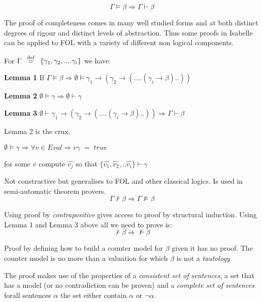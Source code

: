 \[ \Gamma \vDash \beta  \Rightarrow \Gamma \vdash \beta \]


The proof of completeness comes in many well studied  forms and at both distinct degrees of rigour and distinct levels of abstraction.  Thus some proofs in Isabelle can be applied to FOL with a variety of different non logical components. 

For $\Gamma  \hspace*{0.5em} \stackrel{\mathrm{def}}{=} \hspace*{0.5em} \{\gamma_1,\gamma_2,.... \gamma_i\}$
we have:

{\bf Lemma 1}
If $\Gamma \vDash \beta \Rightarrow \emptyset \vDash \gamma_1 \rightarrow (\gamma_2 \rightarrow (....(\gamma_i\rightarrow \beta)..))$

{\bf Lemma 2}
$ \emptyset\vDash \gamma  \Rightarrow \emptyset\vdash \gamma $

{\bf Lemma 3} $\emptyset \vdash \gamma_1 \rightarrow (\gamma_2 \rightarrow (....(\gamma_i\rightarrow \beta)..))\Rightarrow \Gamma \vdash \beta$


Lemma 2 is the crux. 

$ \emptyset\vDash \gamma  \Rightarrow \forall v\in Eval \Rightarrow v\gamma\; = \;true$

for some $v$ compute $\hat{v_j}$ so that $\{\hat{v_1},\hat{v_2},.. \hat{v_i}\} \vdash \gamma$



Not constructive but generalises to FOL and other classical logics. Is used in semi-automatic theorem provers. 
 \[ \Gamma \not\vdash \beta  \Rightarrow \Gamma \not\vDash \beta \]

Using proof by \emph{contrapositive} gives access to proof by structural induction.
Using Lemma 1 and Lemma 3 above all we need to prove is:
 \[  \not\vdash \beta  \Rightarrow  \not\vDash \beta \]

Proof by defining how to build a counter model for $\beta$ given it has no proof.  The counter model is no more than a valuation for which $\beta$ is not a \emph{tautology}

The proof makes use of the properties of a \emph{consistent set of sentences}, a set that has a model (or no contradiction can be proven)  and a \emph{complete set of sentences} forall sentences $\alpha$ the set either contain $\alpha$ or $\neg \alpha$.

